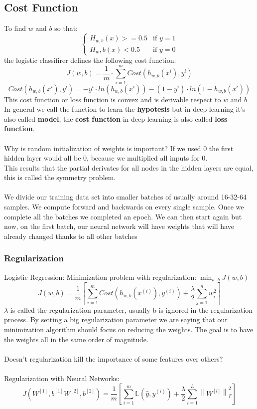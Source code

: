 \documentclass{article}
\newcommand{\norm}[1]{\left\lVert#1\right\rVert}
\begin{document}
\subsection{Cost Function}
To find $w$ and $b$ so that:
$$\begin{cases}
    H_{w,b}(x) >= 0.5 & \text{if } y=1\\
    H_w,b(x)<0.5 & \text{if } y=0
\end{cases}$$
the logistic classifirer defines the following cost function:
\begin{equation}
    J(w,b) = \frac{1}{m}\cdot \sum_{i=1}^{m}{Cost(h_{w,b}(x^i),y^i)}
\end{equation}
\begin{equation}
    Cost(h_{w,b}(x^i),y^i)= -y^i\cdot ln(h_{w,b}(x^i))-(1-y^i)\cdot ln(1-h_{w,b}(x^i))
\end{equation}
This cost function or loss function is convex and is derivable respect to $w$ and $b$
In general we call the function to learn the \textbf{hypotesis} but in deep learning it's also called \textbf{model}, the \textbf{cost function} in deep learning is also called \textbf{loss function}.\\\\
Why is random initialization of weights is important? If we used 0 the first hidden layer would all be 0, because we multiplied all inputs for 0.\\
This results that the partial derivates for all nodes in the hidden layers are equal, this is called the symmetry problem.\\\\
We divide our training data set into smaller batches of usually around 16-32-64 samples. We compute forward and backwards on every single sample. Once we complete all the batches we completed an epoch. We can then start again but now, on the first batch, our neural network will have weights that will have already changed thanks to all other batches

\subsubsection*{Regularization}
Logistic Regression: Minimization problem with regularization:$ \;\min_{w,b}{J(w,b)}$
$$J(w,b)= \frac{1}{m}\left[ \sum_{i=1}^{m}{Cost(h_{w,b}(x^{(i)}), y^{(i)})+\frac{\lambda}{2}\sum_{j=1}^{n}{w_i^2}} \right]$$
$\lambda$ is called the regularization parameter, usually b is ignored in the regularization process.
By setting a big regularization parameter we are saying that our minimization algorithm should focus on reducing the weights. The goal is to have the weights all in the same order of magnitude.\\\\
Doesn't regularization kill the importance of some features over others?\\\\
Regularization with Neural Networks:\\
$$J(W^{[1]}, b^{[1]}W^{[2]}, b^{[2]})= \frac{1}{m}\left[ \sum_{i=1}^{m}{\mathbb{L}(\hat{y}, y^{(i)})+\frac{\lambda}{2}\sum_{i=1}^{L}{\norm{W^{[l]}}^2_F}} \right]$$
\end{document}
